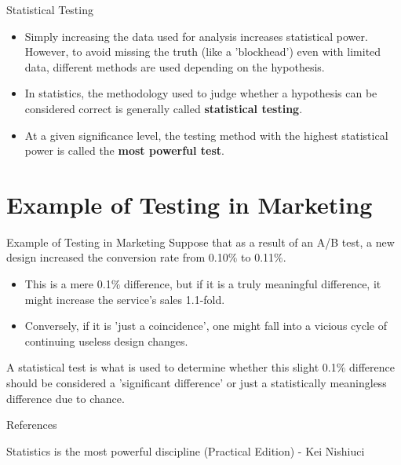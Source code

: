 \documentclass[dvipdfmx, autodetect-engine, aspectratio=169, 10.5pt]{beamer}
\begin{document}
\begin{frame}{Statistical Testing}
	\begin{itemize}
		\item Simply increasing the data used for analysis increases statistical power. However, to avoid missing the truth (like a 'blockhead') even with limited data, different methods are used depending on the hypothesis.
		      \vspace{5mm}
		\item In statistics, the methodology used to judge whether a hypothesis can be considered correct is generally called \textbf{statistical testing}.
		      \vspace{5mm}
		\item At a given significance level, the testing method with the highest statistical power is called the \textbf{most powerful test}.
	\end{itemize}
\end{frame}

\section{Example of Testing in Marketing}

\begin{frame}{Example of Testing in Marketing}
	Suppose that as a result of an A/B test, a new design increased the conversion rate from 0.10$\%$ to 0.11$\%$.
	\vspace{5mm}
	\begin{itemize}
		\item This is a mere 0.1$\%$ difference, but if it is a truly meaningful difference, it might increase the service's sales 1.1-fold.
		\item Conversely, if it is 'just a coincidence', one might fall into a vicious cycle of continuing useless design changes.
	\end{itemize}
	\vspace{5mm}
	A statistical test is what is used to determine whether this slight 0.1$\%$ difference should be considered a 'significant difference' or just a statistically meaningless difference due to chance.
\end{frame}

\begin{frame}[allowframebreaks]{References}
	\begin{thebibliography}{9}
		Statistics is the most powerful discipline (Practical Edition) - Kei Nishiuci
	\end{thebibliography}
\end{frame}
\end{document}
